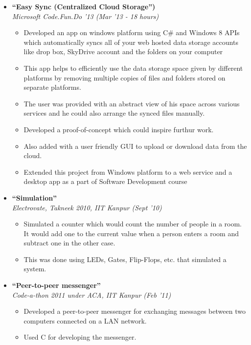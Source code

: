 \documentclass[margin,line]{resume}
\begin{document}
\begin{resume}
\begin{itemize}
  \item \large{\textbf{\textsf{``Easy Sync (Centralized Cloud Storage'')}}}
    \\ \small{\textit{Microsoft Code.Fun.Do '13 (Mar '13 - 18 hours)}}
    \normalsize
    \begin{itemize}
    \item Developed an app on windows platform using C\# and Windows 8 APIs which automatically syncs all of your web hosted data storage accounts like drop box, SkyDrive account and the folders on your computer 
    \item This app helps to efficiently use the data storage space given by different platforms by removing multiple copies of files and folders stored on separate platforms.
    \item The user was provided with an abstract view of his space across various services and he could also arrange the synced files manually.
    \item Developed a proof-of-concept which could inspire furthur work.
    \item Also added with a user friendly GUI to upload or download data from the cloud.
    \item Extended this project from Windows platform to a web service and a desktop app as a part of Software Development course
    \end{itemize}

  \item \large{\textbf{\textsf{``Simulation''}}}
    \\ \small{\textit{Electrovate, Takneek 2010, IIT Kanpur (Sept '10)}}
    \normalsize
    \begin{itemize}
    \item Simulated a counter which would count the number of people in a room. It would add one to the current value when a person enters a room and subtract one in the other case.
    \item This was done using LEDs, Gates, Flip-Flops, etc. that simulated a system.
    \end{itemize}

  \item \large{\textbf{\textsf{``Peer-to-peer messenger''}}}
    \\ \small{\textit{Code-a-thon 2011 under ACA, IIT Kanpur (Feb '11)}}
    \normalsize
    \begin{itemize}
    \item Developed a peer-to-peer messenger for exchanging messages between two computers connected on a LAN network.
    \item Used C for developing the messenger.
    \end{itemize}


\end{itemize}
\end{resume}
\end{document}

